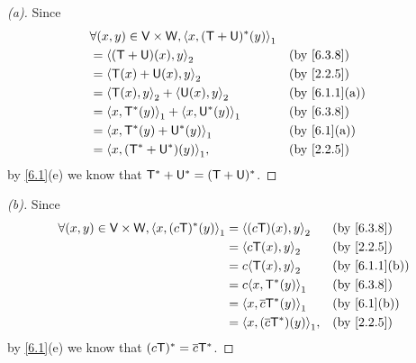 \begin{proof}[(a)]
  Since
  \begin{align*}
     & \forall (x, y) \in \V \times \W, \inn{x, (\T + \U)^*(y)}_1                                  \\
     & = \inn{(\T + \U)(x), y}_2                                  &  & \text{(by \cref{6.3.8})}    \\
     & = \inn{\T(x) + \U(x), y}_2                                 &  & \text{(by \cref{2.2.5})}    \\
     & = \inn{\T(x), y}_2 + \inn{\U(x), y}_2                      &  & \text{(by \cref{6.1.1}(a))} \\
     & = \inn{x, \T^*(y)}_1 + \inn{x, \U^*(y)}_1                  &  & \text{(by \cref{6.3.8})}    \\
     & = \inn{x, \T^*(y) + \U^*(y)}_1                             &  & \text{(by \cref{6.1}(a))}   \\
     & = \inn{x, (\T^* + \U^*)(y)}_1,                             &  & \text{(by \cref{2.2.5})}
  \end{align*}
  by \cref{6.1}(e) we know that \(\mathsf{T}^* + \mathsf{U}^* = (\mathsf{T} + \mathsf{U})^*\).
\end{proof}

\begin{proof}[(b)]
  Since
  \begin{align*}
    \forall (x, y) \in \V \times \W, \inn{x, (c \T)^*(y)}_1 & = \inn{(c \T)(x), y}_2           &  & \text{(by \cref{6.3.8})}    \\
                                                            & = \inn{c \T(x), y}_2             &  & \text{(by \cref{2.2.5})}    \\
                                                            & = c \inn{\T(x), y}_2             &  & \text{(by \cref{6.1.1}(b))} \\
                                                            & = c \inn{x, \T^*(y)}_1           &  & \text{(by \cref{6.3.8})}    \\
                                                            & = \inn{x, \conj{c} \T^*(y)}_1    &  & \text{(by \cref{6.1}(b))}   \\
                                                            & = \inn{x, (\conj{c} \T^*)(y)}_1, &  & \text{(by \cref{2.2.5})}
  \end{align*}
  by \cref{6.1}(e) we know that \((c \mathsf{T})^* = \overline{c} \mathsf{T}^*\).
\end{proof}

